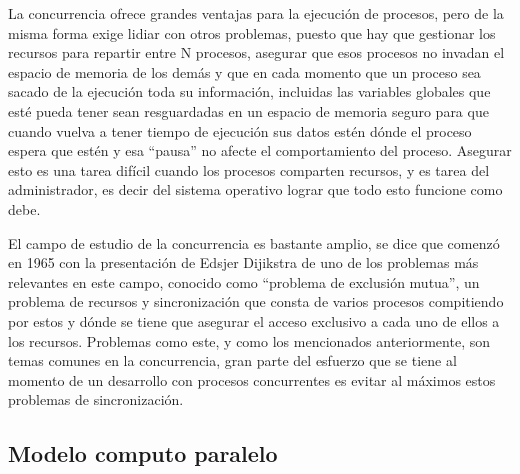 \documentclass[letterpaper,12pt,oneside]{book}
\begin{document}
		La concurrencia ofrece grandes ventajas para la ejecución de procesos, pero de la misma forma exige lidiar con otros problemas, puesto
		que hay que gestionar los recursos para repartir entre N procesos, asegurar que esos procesos no invadan el espacio de memoria
		de los demás y que en cada momento que un proceso sea sacado de la ejecución toda su información, incluidas las variables globales
		que esté pueda tener sean resguardadas en un espacio de memoria seguro para que cuando vuelva a tener tiempo de ejecución
		sus datos estén dónde el proceso espera que estén y esa ``pausa'' no afecte el comportamiento del proceso. Asegurar esto es una
		tarea difícil cuando los procesos comparten recursos, y es tarea del administrador, es decir del sistema operativo
		lograr que todo esto funcione como debe\cite{leslie_lamport_computer_2015}.
		
		El campo de estudio de la concurrencia es bastante amplio, se dice que comenzó en 1965 con la presentación de Edsjer Dijikstra de uno
		de los problemas más relevantes en este campo, conocido como ``problema de exclusión mutua'', un 
		problema de recursos y sincronización que consta de varios procesos compitiendo por estos y dónde se tiene que asegurar el acceso exclusivo a 
		cada uno
		de ellos a los recursos\cite{gadi_taubenfeld_concurrent_nodate}.  Problemas como este, y como los mencionados anteriormente,
		son temas comunes en la concurrencia, gran parte del esfuerzo que se tiene al momento de un desarrollo con procesos
		concurrentes es evitar al máximos estos problemas de sincronización.
		

		
		
		

		\subsection{Modelo computo paralelo}
		
\end{document}
